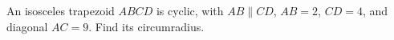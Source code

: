 An isosceles trapezoid $ABCD$ is cyclic, with $AB\parallel CD$, $AB=2$, $CD=4$, and diagonal $AC=9$. Find its circumradius.
